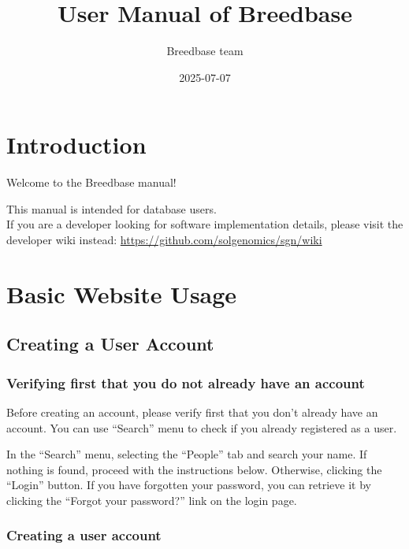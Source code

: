 \documentclass[
  12pt,
]{book}
\title{User Manual of Breedbase}
\author{Breedbase team}
\date{2025-07-07}
\begin{document}
\maketitle

{
\hypersetup{linkcolor=}
\setcounter{tocdepth}{2}
\tableofcontents
}
\hypertarget{introduction}{%
\chapter*{Introduction}\label{introduction}}


Welcome to the Breedbase manual!

This manual is intended for database users.\\
If you are a developer looking for software implementation details, please visit the developer wiki instead: \url{https://github.com/solgenomics/sgn/wiki}

\hypertarget{basic-website-usage}{%
\chapter{Basic Website Usage}\label{basic-website-usage}}

\hypertarget{creating-a-user-account}{%
\section{Creating a User Account}\label{creating-a-user-account}}

\hypertarget{verifying-first-that-you-do-not-already-have-an-account}{%
\subsection{Verifying first that you do not already have an account}\label{verifying-first-that-you-do-not-already-have-an-account}}

Before creating an account, please verify first that you don't already have an account. You can use ``Search'' menu to check if you already registered as a user.

In the ``Search'' menu, selecting the ``People'' tab and search your name. If nothing is found, proceed with the instructions below. Otherwise, clicking the ``Login'' button. If you have forgotten your password, you can retrieve it by clicking the ``Forgot your password?'' link on the login page.

\hypertarget{creating-a-user-account-1}{%
\subsection{Creating a user account}\label{creating-a-user-account-1}}
\end{document}
